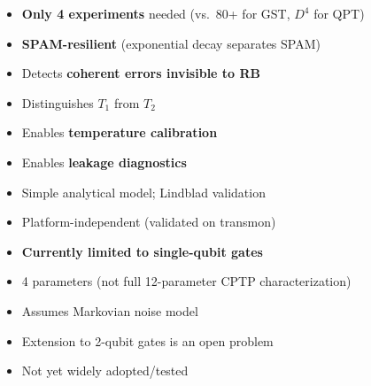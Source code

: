 \documentclass[10pt,a4paper]{article}
\begin{document}
\begin{minipage}[t]{0.48\textwidth}
\begin{prosbox}
\begin{itemize}
  \item \textbf{Only 4 experiments} needed (vs.\ 80+ for GST, $D^4$ for QPT)
  \item \textbf{SPAM-resilient} (exponential decay separates SPAM)
  \item Detects \textbf{coherent errors invisible to RB}
  \item Distinguishes $T_1$ from $T_2$
  \item Enables \textbf{temperature calibration}
  \item Enables \textbf{leakage diagnostics}
  \item Simple analytical model; Lindblad validation
  \item Platform-independent (validated on transmon)
\end{itemize}
\end{prosbox}
\end{minipage}
\hfill
\begin{minipage}[t]{0.48\textwidth}
\begin{consbox}
\begin{itemize}
  \item \textbf{Currently limited to single-qubit gates}
  \item 4 parameters (not full 12-parameter CPTP characterization)
  \item Assumes Markovian noise model
  \item Extension to 2-qubit gates is an open problem
  \item Not yet widely adopted/tested
\end{itemize}
\end{consbox}
\end{minipage}
\end{document}
